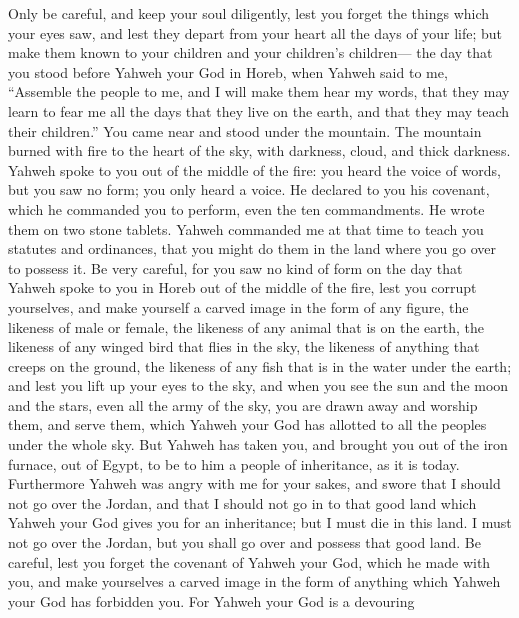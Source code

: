  Only be careful, and keep your soul diligently, lest you
forget the things which your eyes saw, and lest they depart from your
heart all the days of your life; but make them known to your children
and your children's children---  the day that you stood
before Yahweh your God in Horeb, when Yahweh said to me, ``Assemble the
people to me, and I will make them hear my words, that they may learn to
fear me all the days that they live on the earth, and that they may
teach their children.''  You came near and stood under
the mountain. The mountain burned with fire to the heart of the sky,
with darkness, cloud, and thick darkness.  Yahweh spoke
to you out of the middle of the fire: you heard the voice of words, but
you saw no form; you only heard a voice.  He declared to
you his covenant, which he commanded you to perform, even the ten
commandments. He wrote them on two stone tablets.  Yahweh
commanded me at that time to teach you statutes and ordinances, that you
might do them in the land where you go over to possess it.
 Be very careful, for you saw no kind of form on the day
that Yahweh spoke to you in Horeb out of the middle of the fire,
 lest you corrupt yourselves, and make yourself a carved
image in the form of any figure, the likeness of male or female,
 the likeness of any animal that is on the earth, the
likeness of any winged bird that flies in the sky,  the
likeness of anything that creeps on the ground, the likeness of any fish
that is in the water under the earth;  and lest you lift
up your eyes to the sky, and when you see the sun and the moon and the
stars, even all the army of the sky, you are drawn away and worship
them, and serve them, which Yahweh your God has allotted to all the
peoples under the whole sky.  But Yahweh has taken you,
and brought you out of the iron furnace, out of Egypt, to be to him a
people of inheritance, as it is today.  Furthermore
Yahweh was angry with me for your sakes, and swore that I should not go
over the Jordan, and that I should not go in to that good land which
Yahweh your God gives you for an inheritance;  but I must
die in this land. I must not go over the Jordan, but you shall go over
and possess that good land.  Be careful, lest you forget
the covenant of Yahweh your God, which he made with you, and make
yourselves a carved image in the form of anything which Yahweh your God
has forbidden you.  For Yahweh your God is a devouring
